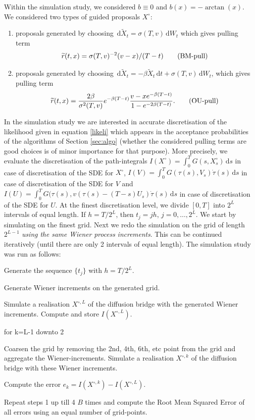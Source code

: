 \documentclass[preprint]{imsart}
\newcommand{\si}{\sigma}
\renewcommand{\tilde}{\widetilde}
\theoremstyle{definition}
\newcommand{\dd}{{\,\mathrm d}}
\begin{document}
Within the simulation study, we considered $b\equiv 0$  and  $b(x)=-\arctan(x)$. 
We considered two types of guided proposals $X^\circ$:
\begin{enumerate}
\item proposals generated by choosing $\dd \tilde{X}_t = \si(T,v) \dd W_t$ which gives pulling term \[  \tilde{r}(t,x)=\si(T,v)^{-2} (v-x)/(T-t) \tag{\text{BM-pull}} \]
\item proposals generated by choosing $\dd \tilde{X}_t =-\beta \tilde{X}_t \dd t + \si(T,v) \dd W_t$, which gives pulling term
\[	\tilde{r}(t,x)= \frac{2 \beta}{\si^2(T,v)} e^{-\beta(T-t)}\frac{v-xe^{-\beta(T-t)}}{1-e^{-2\beta(T-t)}}.\tag{\text{OU-pull}}\] 
\end{enumerate}
In the simulation study we are  interested in accurate discretisation of the likelihood given in equation \eqref{likeli} which appears in the acceptance probabilities of the algorithms of Section \ref{sec:algo} (whether the considered pulling terms are good choices is of minor importance for that purpose). More precisely, we evaluate the discretisation of the path-integrals 
 $I(X^\circ)= \int_0^T G(s,X^\circ_s) \dd s$ in case of discretisation of the SDE for $X^\circ$, $I(V)=\int_0^T G(\tau(s), V_s) \dot\tau(s) \dd s$ in case of discretisation of the SDE for $V$ and $I(U)=\int_0^T G(\tau(s), v(\tau(s)-(T-s) U_s) \dot\tau(s) \dd s$ in case of discretisation of the SDE for $U$. 
At the finest discretisation level, we divide $[0,T]$ into  $2^L$ intervals of equal length. 
If $h=T/2^L$, then $t_j=jh$, $j=0,\ldots, 2^L$. We start by simulating on the finest grid. Next we redo the simulation on the grid of length $2^{L-1}$ {\it using the same Wiener process increments}. This can be continued iteratively (until there are only 2 intervals of equal length). 
The simulation study was run as follows:
\begin{compactenum}
\item Generate the sequence $\{t_j\}$ with $h=T/2^L$.
\item Generate Wiener increments on the generated grid.
\item Simulate a realisation $X^{\circ,L}$  of the diffusion bridge with the generated Wiener increments. Compute and store  $I(X^{\circ,L})$. 
\item for k=L-1 downto 2
\begin{compactitem}
\item Coarsen the grid by removing the 2nd, 4th, 6th, etc point from the grid and aggregate the Wiener-increments. Simulate a realisation $X^{\circ,k}$ of the diffusion bridge with these Wiener increments.
\item Compute the error $e_k=I(X^{\circ,k})-I(X^{\circ,L})$. 
\end{compactitem}
\item Repeat steps 1 up till 4 $B$ times and compute  the Root Mean Squared Error of all errors using an equal number of grid-points. 
\end{compactenum}
\end{document}
